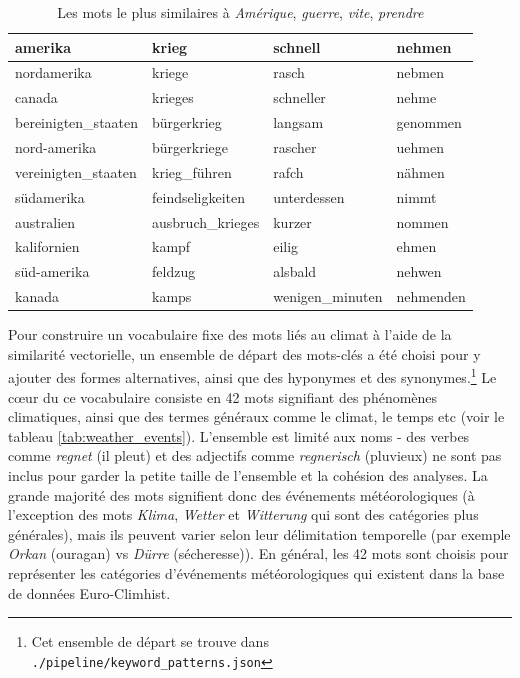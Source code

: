 \documentclass[a4paper,twoside,12pt]{article}
\begin{document}
\begin{table}[h]
    \centering
    \small
    \begin{tabular}{llll}
\toprule
            \textbf{amerika} &            \textbf{krieg} &         \textbf{schnell} &    \textbf{nehmen} \\
\midrule
        nordamerika &           kriege &           rasch &    nebmen \\
             canada &          krieges &       schneller &     nehme \\
bereinigten\_staaten &      bürgerkrieg &         langsam &  genommen \\
       nord-amerika &     bürgerkriege &         rascher &    uehmen \\
vereinigten\_staaten &     krieg\_führen &           rafch &    nähmen \\
         südamerika & feindseligkeiten &     unterdessen &     nimmt \\
         australien & ausbruch\_krieges &          kurzer &    nommen \\
        kalifornien &            kampf &           eilig &     ehmen \\
        süd-amerika &          feldzug &         alsbald &    nehwen \\
             kanada &            kamps & wenigen\_minuten & nehmenden \\
\bottomrule
\end{tabular}
    \caption{Les mots le plus similaires à \textit{Amérique}, \textit{guerre}, \textit{vite}, \textit{prendre}}
    \label{tab:similar_vectors}
\end{table}

Pour construire un vocabulaire fixe des mots liés au climat à l'aide de la similarité vectorielle, un ensemble de départ des mots-clés a été choisi pour y ajouter des formes alternatives, ainsi que des hyponymes et des synonymes.\footnote{Cet ensemble de départ se trouve dans \texttt{./pipeline/keyword\_patterns.json}} Le cœur du ce vocabulaire consiste en 42 mots signifiant des phénomènes climatiques, ainsi que des termes généraux comme le climat, le temps etc (voir le tableau \ref{tab:weather_events}). L'ensemble est limité aux noms - des verbes comme \textit{regnet} (il pleut) et des adjectifs comme \textit{regnerisch} (pluvieux) ne sont pas inclus pour garder la petite taille de l'ensemble et la cohésion des analyses. La grande majorité des mots signifient donc des événements météorologiques (à l'exception des mots \textit{Klima}, \textit{Wetter} et \textit{Witterung} qui sont des catégories plus générales), mais ils peuvent varier selon leur délimitation temporelle (par exemple \textit{Orkan} (ouragan) vs \textit{Dürre} (sécheresse)). En général, les 42 mots sont choisis pour représenter les catégories d'événements météorologiques qui existent dans la base de données Euro-Climhist.
\end{document}
